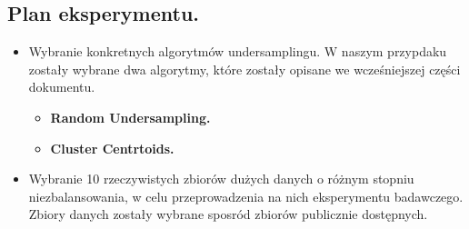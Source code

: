 \documentclass{article}
\begin{document}
\subsection{Plan eksperymentu.}
\begin{itemize}
    \item Wybranie konkretnych algorytmów undersamplingu. W naszym przypdaku zostały wybrane dwa algorytmy, które zostały opisane we wcześniejszej części dokumentu.
    \begin{itemize}
        \item \textbf{Random Undersampling.}
        \item \textbf{Cluster Centrtoids.}
    \end{itemize}
    \item Wybranie 10 rzeczywistych zbiorów dużych danych o różnym stopniu niezbalansowania, w celu przeprowadzenia na nich eksperymentu badawczego. Zbiory danych zostały wybrane sposród zbiorów publicznie  dostępnych.  \newline
  

\end{itemize}
\end{document}
